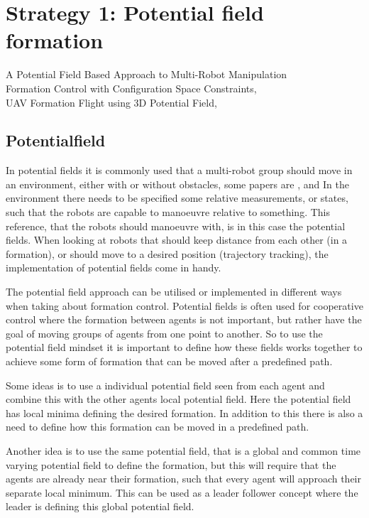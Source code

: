 \section{Strategy 1: Potential field formation}
A Potential Field Based Approach to Multi-Robot Manipulation \citep{pfmrm}\\
Formation Control with Configuration Space Constraints, \citep{fccsc}\\
UAV Formation Flight using 3D Potential Field, \citep{UAVff3dpf}\\


\subsection{Potentialfield}
In potential fields it is commonly used that a multi-robot group should move in an environment, either with or without obstacles, some papers are \citep{pfmrm}, \citep{fccsc} and \citep{UAVff3dpf} In the environment there needs to be specified some relative measurements, or states, such that the robots are capable to manoeuvre relative to something. This reference, that the robots should manoeuvre with, is in this case the potential fields. When looking at robots that should keep distance from each other (in a formation), or should move to a desired position (trajectory tracking), the implementation of potential fields come in handy.

The potential field approach can be utilised or implemented in
different ways when taking about formation control. Potential fields
is often used for cooperative control where the formation between
agents is not important, but rather have the goal of moving groups of
agents from one point to another.  So to
use the potential field mindset it is important to define how these
fields works together to achieve some form of formation that can be
moved after a predefined path. 

Some ideas is to use a individual potential field seen from each
agent and combine this with the other agents local potential field.
Here the potential field has local minima defining the desired
formation. In addition to this there is also a need to define how this
formation can be moved in a predefined path.

Another idea is to use the same potential field, that is a global and
common time varying potential field to define the formation, but this
will require that the agents are already near their formation, such
that every agent will approach their separate local minimum. This can
be used as a leader follower concept where the leader is defining this
global potential field.


